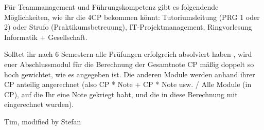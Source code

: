 Für Teammanagement und Führungskompetenz gibt es folgendende Möglichkeiten, wie ihr die 4CP bekommen könnt: Tutoriumsleitung (PRG 1 oder 2) oder Strufo (Praktikumsbetreuung), IT-Projektmanagement, Ringvorlesung Informatik + Gesellschaft. 


Solltet ihr nach 6 Semestern alle Prüfungen erfolgreich absolviert haben , wird euer Abschlussmodul für die Berechnung der Gesamtnote CP mäßig doppelt so hoch gewichtet, wie es angegeben ist. Die anderen Module werden anhand ihrer CP anteilig angerechnet (also CP * Note + CP * Note usw. / Alle Module (in CP), auf die Ihr eine Note gekriegt habt, und die in diese Berechnung mit eingerechnet wurden).


\begin{flushright} Tim, modified by Stefan \end{flushright}